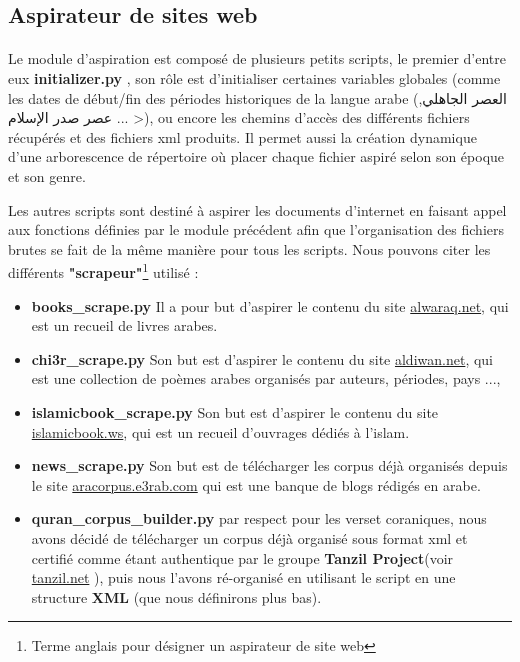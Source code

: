 \documentclass[]{report}
\begin{document}
		\subsection{Aspirateur de sites web}
			\paragraph{}
			Le module d'aspiration est composé de plusieurs petits scripts,
			le premier d'entre eux  \textbf{initializer.py} , son rôle est d'initialiser certaines
			variables globales (comme les dates de début/fin des périodes historiques de la langue arabe (\<العصر الجاهلي, عصر صدر الإسلام ... >), ou encore les chemins d'accès des différents fichiers récupérés et des fichiers xml produits.
			Il permet aussi la création dynamique d'une arborescence de répertoire où placer chaque fichier aspiré selon son époque et son genre.
			\par 
			Les autres scripts sont destiné à aspirer les documents d'internet en faisant appel aux fonctions définies par le module précédent afin que l'organisation des fichiers brutes se fait de la même manière pour tous les scripts. Nous pouvons citer les différents \textbf{"scrapeur"}\footnote{Terme anglais pour désigner un aspirateur de site web} utilisé : 
			\begin{itemize}
				\item \textbf{books\_scrape.py} Il a pour but d'aspirer le contenu du site \href{http://www.alwaraq.net/Core/index.jsp?option=1}{alwaraq.net}, qui est un recueil de livres arabes.
				
				\item \textbf{chi3r\_scrape.py} Son but est d'aspirer le contenu du site \href{https://www.aldiwan.net/}{aldiwan.net}, qui est une collection de poèmes arabes organisés par auteurs, périodes, pays ..., 
				
				\item \textbf{islamicbook\_scrape.py} Son but est d'aspirer le contenu du site \href{https://www.islamicbook.ws/}{islamicbook.ws}, qui est un 
				recueil d'ouvrages dédiés à l'islam.
				
				\item \textbf{news\_scrape.py} Son but est de télécharger les corpus déjà organisés depuis le site \href{http://aracorpus.e3rab.com/}{aracorpus.e3rab.com} qui est une banque de blogs rédigés en arabe.
%				
				
				\item \textbf{quran\_corpus\_builder.py} par respect pour les verset coraniques, nous avons décidé de télécharger un corpus déjà organisé sous format xml et certifié comme étant authentique par le groupe \textbf{Tanzil Project}(voir \href{http://tanzil.net/#19:3}{tanzil.net} ), puis nous l'avons ré-organisé en utilisant le script en une structure \textbf{XML} (que nous définirons plus bas).
				
			\end{itemize} 
\end{document}
